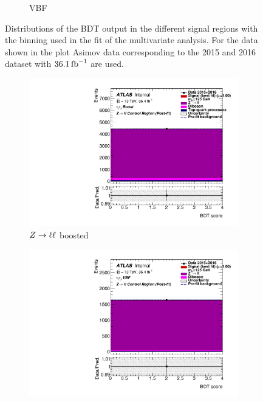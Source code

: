 \begin{figure}[htb]
\begin{subfigure}[t]{0.45\textwidth}
        \caption{VBF}
    \end{subfigure}
    \caption{Distributions of the BDT output in the different signal regions with the binning used in the fit of the multivariate analysis.
             For the data shown in the plot Asimov data corresponding to the 2015 and 2016 dataset with $\SI{36.1}{\invfb}$ are used.}\label{fig:fit:input:mva:SR}
\end{figure}

\begin{figure}[htb]
    \centering
    \begin{subfigure}[t]{0.45\textwidth}
        \includegraphics[width=\textwidth]{./plots/fit/mva/zll_boost.pdf}
        \caption{$Z \to \ell \ell$ boosted}
    \end{subfigure}
    \begin{subfigure}[t]{0.45\textwidth}
        \includegraphics[width=\textwidth]{./plots/fit/mva/zll_vbf.pdf}

\end{subfigure}
\end{figure}
